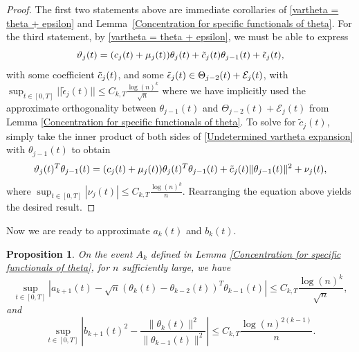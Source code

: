 \documentclass{amsart}
\newtheorem{prop}[thm]{Proposition}
\numberwithin{equation}{section}
\begin{document}
\begin{proof}
    The first two statements above are immediate corollaries of \eqref{vartheta = theta + epsilon} and Lemma~\ref{Concentration for specific functionals of theta}. For the third statement, by \eqref{vartheta = theta + epsilon}, we must be able to express
    \begin{equation}\label{Undetermined vartheta expansion}
        \vartheta_j(t)=(c_j(t)+\mu_j(t))\theta_j(t)+\Tilde{c}_{j}(t)\theta_{j-1}(t)+\Tilde{\epsilon}_{j}(t),
    \end{equation}
    with some coefficient $\Tilde{c}_{j}(t)$, and some $\Tilde{\epsilon}_{j}(t) \in \Theta_{j-2}(t)+ \mathcal{E}_j(t)$, with 
    $\sup_{t \in [0,T]}||\tilde{\epsilon}_{j}(t)|| \leq C_{k,T} \frac{\log(n)^k}{\sqrt{n}}$ where we have implicitly used the approximate orthogonality between $\theta_{j-1}(t)$ and $\Theta_{j-2}(t)+ \mathcal{E}_j(t)$ from Lemma \ref{Concentration for specific functionals of theta}. To solve for $\tilde{c}_j(t)$, simply take the inner product of both sides of \eqref{Undetermined vartheta expansion} with $\theta_{j-1}(t)$ to obtain
    \begin{equation}
        \vartheta_j(t)^T\theta_{j-1}(t)=(c_j(t)+\mu_j(t))\theta_j(t)^T\theta_{j-1}(t)+\Tilde{c}_j(t)\|\theta_{j-1}(t)\|^2+\nu_j(t),
    \end{equation}
    where $\sup_{t \in [0,T]} |\nu_j(t)|\leq C_{k,T}\frac{\log(n)^k}{n}$. Rearranging the equation above yields the desired result.
\end{proof}

Now we are ready to approximate $a_k(t)$ and $b_k(t)$.
\begin{prop}
    On the event $A_k$ defined in Lemma \ref{Concentration for specific functionals of theta}, for $n$ sufficiently large, we have
    \begin{equation}\label{a_k approx equation}
        \sup_{t \in [0,T]}|a_{k+1}(t)-\sqrt{n}(\theta_{k}(t)-\theta_{k-2}(t))^T\theta_{k-1}(t)| \leq C_{k,T}\frac{\log(n)^k}{\sqrt{n}},
    \end{equation}
    and
    \begin{equation}\label{b_k approx equation}
        \sup_{t \in [0,T]}\left|b_{k+1}(t)^2-\frac{\|\theta_k(t)\|^2}{\|\theta_{k-1}(t)\|^2}\right| \leq C_{k,T}\frac{\log(n)^{2(k-1)}}{n}.
    \end{equation}
\end{prop}
\end{document}
